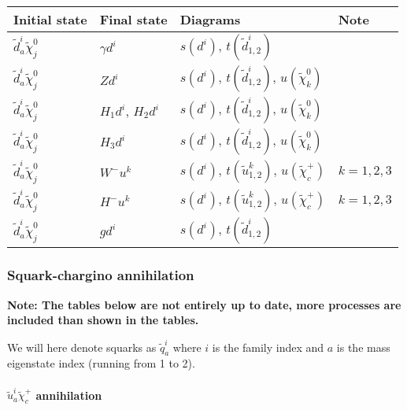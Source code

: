 \begin{center}
\begin{tabular}{llll} \hline
{\bfseries Initial state} & {\bfseries Final state} &
{\bfseries Diagrams} & {\bfseries Note} \\ \hline \tabspace
$\tilde{d}^i_a \tilde{\chi}_{j}^0$ & $\gamma d^i$ &
$s(d^{i})$, $t(\tilde{d}^i_{1,2})$  \\
$\tilde{d}^i_a \tilde{\chi}_{j}^0$ & $Z d^i$ &
$s(d^{i})$, $t(\tilde{d}^i_{1,2})$, $u(\tilde{\chi}_k^0)$ \\
$\tilde{d}^i_a \tilde{\chi}_{j}^0$ & $H_{1} d^i$, $H_{2} d^i$ &
$s(d^{i})$, $t(\tilde{d}^i_{1,2})$, $u(\tilde{\chi}_k^0)$ \\
$\tilde{d}^i_a \tilde{\chi}_{j}^0$ & $H_{3} d^i$  &
$s(d^{i})$, $t(\tilde{d}^i_{1,2})$, $u(\tilde{\chi}_k^0)$ \\ 
$\tilde{d}^i_a \tilde{\chi}_{j}^0$ & $W^- u^k$  &
$s(d^{i})$, $t(\tilde{u}^k_{1,2})$, $u(\tilde{\chi}_c^+)$ 
& $k=1,2,3$ \\
$\tilde{d}^i_a \tilde{\chi}_{j}^0$ & $H^- u^k$  &
$s(d^{i})$, $t(\tilde{u}^k_{1,2})$, $u(\tilde{\chi}_c^+)$ 
& $k=1,2,3$  \\
$\tilde{d}^i_a \tilde{\chi}_{j}^0$ & $g d^i$  &
$s(d^i)$, $t(\tilde{d}^i_{1,2})$ \\ \hline
\end{tabular}
\end{center}

\subsubsection{Squark-chargino annihilation}

{\bfseries Note: The tables below are not entirely up to date, more processes are included
than shown in the tables.}

\smallskip


We will here denote squarks as $\tilde{q}^i_a$ where $i$ is the family
index and $a$ is the mass eigenstate index (running from 1 to 2).

\paragraph{$\tilde{u}^i_{a} \tilde{\chi}_{c}^{+}$ annihilation}

